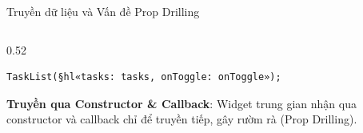 \documentclass[aspectratio=169, 11pt]{beamer}
\begin{document}
\begin{frame}[fragile]{Truyền dữ liệu và Vấn đề Prop Drilling}
\begin{columns}[c, onlytextwidth]
\begin{column}{0.52\textwidth}
\begin{codepanel}[top=8pt, bottom=8pt]
\begin{Verbatim}[commandchars=§«»,fontsize=\fontsize{7.5pt}{10.5pt}\selectfont]
TaskList(§hl«tasks: tasks, onToggle: onToggle»);
\end{Verbatim}
      \end{codepanel}

      \vspace{0.18cm}
      \begin{tcolorbox}[colback=CodeBg, colframe=DarkMain, left=6pt, right=6pt, top=5pt, bottom=5pt]
        \fontsize{8.2pt}{11.2pt}\selectfont
        \textbf{Truyền qua Constructor \& Callback}:\newline
        Widget trung gian nhận qua constructor và callback chỉ để truyền tiếp, gây rườm rà (Prop Drilling).
      \end{tcolorbox}
    \end{column}%
  \end{columns}
\end{frame}
\end{document}
